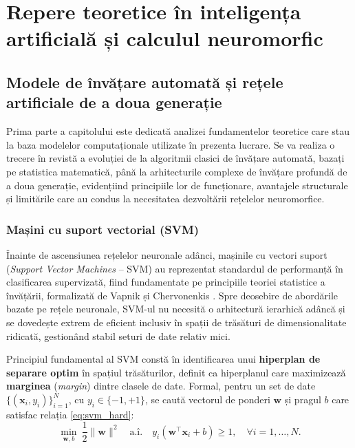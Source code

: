 \chapter{Repere teoretice în inteligența artificială și calculul neuromorfic}
\label{ch:fundamente_teoretice}

\section{Modele de învățare automată și rețele artificiale de a doua generație}

Prima parte a capitolului este dedicată analizei fundamentelor teoretice care stau la baza modelelor computaționale utilizate în prezenta lucrare. Se va realiza o trecere în revistă a evoluției de la algoritmii clasici de învățare automată, bazați pe statistica matematică, până la arhitecturile complexe de învățare profundă de a doua generație, evidențiind principiile lor de funcționare, avantajele structurale și limitările care au condus la necesitatea dezvoltării rețelelor neuromorfice.

\subsection*{Mașini cu suport vectorial (SVM)}
Înainte de ascensiunea rețelelor neuronale adânci, mașinile cu vectori suport (\textit{Support Vector Machines} -- SVM) au reprezentat standardul de performanță în clasificarea supervizată, fiind fundamentate pe principiile teoriei statistice a învățării, formalizată de Vapnik și Chervonenkis \cite{vapnik1995}. Spre deosebire de abordările bazate pe rețele neuronale, SVM-ul nu necesită o arhitectură ierarhică adâncă și se dovedește extrem de eficient inclusiv în spații de trăsături de dimensionalitate ridicată, gestionând stabil seturi de date relativ mici.

Principiul fundamental al SVM constă în identificarea unui \textbf{hiperplan de separare optim} în spațiul trăsăturilor, definit ca hiperplanul care maximizează \textbf{marginea} (\textit{margin}) dintre clasele de date. Formal, pentru un set de date $\{(\mathbf{x}_i, y_i)\}_{i=1}^{N}$, cu $y_i \in \{-1, +1\}$, se caută vectorul de ponderi $\mathbf{w}$ și pragul $b$ care satisfac relația \eqref{eq:svm_hard}:
\begin{equation}
	\label{eq:svm_hard}
	\min_{\mathbf{w}, b}\ \frac{1}{2}\|\mathbf{w}\|^2 \quad \text{a.î.} \quad y_i(\mathbf{w}^\top \mathbf{x}_i + b) \geq 1, \quad \forall i = 1, \dots, N.
\end{equation}

